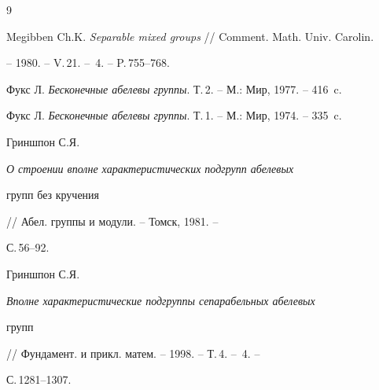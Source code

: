 \begin{thebibliography}{9}







Megibben Ch.K. {\em Separable mixed groups} // Comment. Math. Univ. Carolin.


-- 1980. -- V.\,21. -- \No\,4. -- P.\,755--768.




Фукс Л. {\em Бесконечные абелевы группы}. Т.\,2. -- М.: Мир, 1977. -- 416~c.




Фукс Л. {\em Бесконечные абелевы группы}. Т.\,1. -- М.: Мир, 1974. -- 335~c.




Гриншпон С.Я. {\em О строении вполне характеристических подгрупп абелевых


групп без кручения} // Абел. группы и модули. -- Томск, 1981. --


С.\,56--92.




Гриншпон С.Я. {\em Вполне характеристические подгруппы сепарабельных абелевых


групп} // Фундамент. и прикл. матем. -- 1998. -- Т.\,4. -- \No\,4. --


С.\,1281--1307.





\end{thebibliography}





\vskip 2cm












\label{end}





